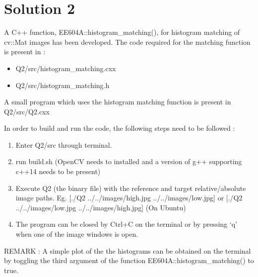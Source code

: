 \documentclass[a4paper,fleqn,11pt]{article}
\theoremstyle{mytheor}
\begin{document}
\section*{Solution 2}
A C++ function, EE604A::histogram\_matching(), for histogram matching of cv::Mat images has been developed.
The code required for the matching function is present in :
\begin{itemize}
\item Q2/src/histogram\_matching.cxx
\item Q2/src/histogram\_matching.h 
\end{itemize}
A small program which uses the histogram matching function is present in Q2/src/Q2.cxx

In order to build and run the code, the following steps need to be followed :
\begin{enumerate}
\item Enter Q2/src through terminal.
\item run build.sh (OpenCV needs to installed and a version of g++ supporting c++14 needs to be present)
\item Execute Q2 (the binary file) with the reference and target relative/absolute image paths. Eg. [./Q2 ../../images/high.jpg ../../images/low.jpg] or [./Q2 ../../images/low.jpg ../../images/high.jpg] (On Ubuntu)
\item The program can be closed by Ctrl+C on the terminal or by pressing `q' when one of the image windows is open.
\end{enumerate}
REMARK : A simple plot of the the histograms can be obtained on the terminal by toggling the third argument of the function EE604A::histogram\_matching() to true.
\end{document}
